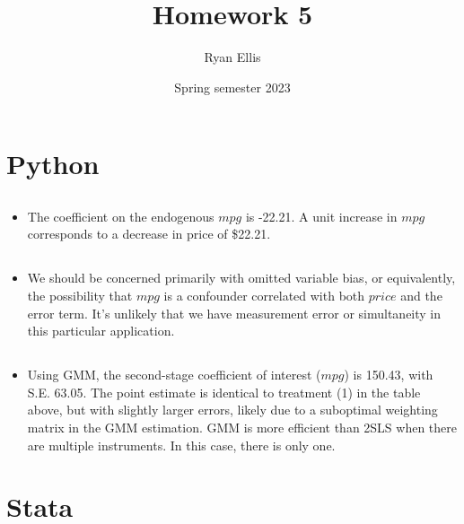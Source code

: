 \documentclass{article}
\title{Homework 5}
\author{Ryan Ellis}
\date{Spring semester 2023}
\begin{document}
  
\maketitle

\section{Python}
\subsection{}
\begin{itemize}
    \item The coefficient on the endogenous $mpg$ is -22.21. A unit increase in $mpg$ corresponds to a decrease in price of \$22.21.
\end{itemize}

\subsection{}
\begin{itemize}
    \item We should be concerned primarily with omitted variable bias, or equivalently, the possibility that $mpg$ is a confounder correlated with both $price$ and the error term. It's unlikely that we have measurement error or simultaneity in this particular application.
\end{itemize}

\subsection{}


\clearpage

\subsection{}
\begin{itemize}
    \item Using GMM, the second-stage coefficient of interest ($mpg$) is 150.43, with S.E. 63.05. The point estimate is identical to treatment (1) in the table above, but with slightly larger errors, likely due to a suboptimal weighting matrix in the GMM estimation. GMM is more efficient than 2SLS when there are multiple instruments. In this case, there is only one.
\end{itemize}


\section{Stata}

\subsection{}
\end{document}
